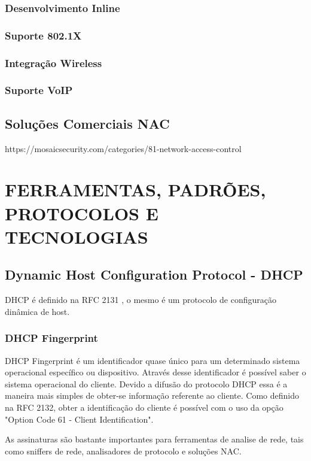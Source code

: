 \documentclass[12pt, brazil, ruledheader, pnumromarab,normaltoc]{abnt}
\begin{document}
\subsection{Desenvolvimento Inline}

\subsection{Suporte 802.1X}

\subsection{Integração Wireless}

\subsection{Suporte VoIP}


\section{Soluções Comerciais NAC}
https://mosaicsecurity.com/categories/81-network-access-control

\chapter{FERRAMENTAS, PADRÕES, PROTOCOLOS E TECNOLOGIAS}
\section{Dynamic Host Configuration Protocol - DHCP}
DHCP é definido na RFC 2131 \cite{rfc-2131}, o mesmo é um protocolo de configuração dinâmica de host.

\subsection{DHCP Fingerprint}\label{sec:dhcp}
DHCP Fingerprint é um identificador quase único para um determinado sistema operacional específico ou dispositivo. Através desse identificador é possível saber o sistema operacional do cliente. Devido a difusão do protocolo DHCP essa é a maneira mais simples de obter-se informação referente ao cliente. Como definido na RFC 2132, obter a identificação do cliente é possível com o uso da opção "Option Code 61 - Client Identification".
\par
As assinaturas são bastante importantes para ferramentas de analise de rede, tais como sniffers de rede, analisadores de protocolo e soluções NAC. %
\end{document}
